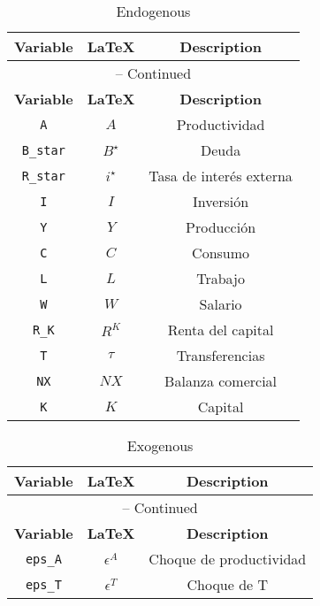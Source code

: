 \begin{center}
\begin{longtable}{ccc}
\caption{Endogenous}\\%
\hline%
\multicolumn{1}{c}{\textbf{Variable}} &
\multicolumn{1}{c}{\textbf{\LaTeX}} &
\multicolumn{1}{c}{\textbf{Description}}\\%
\hline\hline%
\endfirsthead
\multicolumn{3}{c}{{\tablename} \thetable{} -- Continued}\\%
\hline%
\multicolumn{1}{c}{\textbf{Variable}} &
\multicolumn{1}{c}{\textbf{\LaTeX}} &
\multicolumn{1}{c}{\textbf{Description}}\\%
\hline\hline%
\endhead
\texttt{A} & $A$ & Productividad\\
\texttt{B\_star} & $B^{\star}$ & Deuda\\
\texttt{R\_star} & $i^{\star}$ & Tasa de interés externa\\
\texttt{I} & $I$ & Inversión\\
\texttt{Y} & $Y$ & Producción\\
\texttt{C} & $C$ & Consumo\\
\texttt{L} & $L$ & Trabajo\\
\texttt{W} & $W$ & Salario\\
\texttt{R\_K} & $R^{K}$ & Renta del capital\\
\texttt{T} & $\tau$ & Transferencias\\
\texttt{NX} & $NX$ & Balanza comercial\\
\texttt{K} & $K$ & Capital\\
\hline%
\end{longtable}
\end{center}
\begin{center}
\begin{longtable}{ccc}
\caption{Exogenous}\\%
\hline%
\multicolumn{1}{c}{\textbf{Variable}} &
\multicolumn{1}{c}{\textbf{\LaTeX}} &
\multicolumn{1}{c}{\textbf{Description}}\\%
\hline\hline%
\endfirsthead
\multicolumn{3}{c}{{\tablename} \thetable{} -- Continued}\\%
\hline%
\multicolumn{1}{c}{\textbf{Variable}} &
\multicolumn{1}{c}{\textbf{\LaTeX}} &
\multicolumn{1}{c}{\textbf{Description}}\\%
\hline\hline%
\endhead
\texttt{eps\_A} & $\epsilon^{A}$ & Choque de productividad\\
\texttt{eps\_T} & $\epsilon^{T}$ & Choque de T\\
\hline%
\end{longtable}
\end{center}
